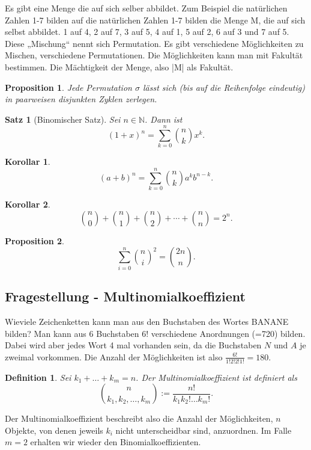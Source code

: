 \documentclass[12pt, twoside]{article}
\newcommand{\N}{\mathbb{N}}
\newtheorem{Sa}{Satz}[subsection]
\newtheorem{Kor}{Korollar}[subsection]
\newtheorem{Prop}{Proposition}[subsection]
\newtheorem{Def}{Definition}[subsection]
\begin{document}
Es gibt eine Menge die auf sich selber abbildet. Zum Beispiel die natürlichen Zahlen 1-7 bilden auf die natürlichen Zahlen 1-7 
bilden die Menge M, die auf sich selbst abbildet. 1 auf 4, 2  auf 7, 3 auf 5, 4 auf 1, 5 auf 2, 6 auf 3 und 7 auf 5. Diese „Mischung“ 
nennt sich Permutation.  Es gibt verschiedene Möglichkeiten zu Mischen, verschiedene Permutationen. Die Möglichkeiten kann man mit Fakultät bestimmen. 
Die Mächtigkeit der Menge, also |M| als Fakultät.

\begin{Prop} 
Jede Permutation $\sigma$ lässt sich (bis auf die Reihenfolge eindeutig) in paarweisen disjunkten Zyklen zerlegen.
\end{Prop}

\begin{Sa}[Binomischer Satz]
Sei $n \in \N$. Dann ist
$$
(1+x)^n= \sum_{k=0}^{n} \binom{n}{k}x^k.
$$
\end{Sa}

\begin{Kor}
$$
(a+b)^n= \sum_{k=0}^{n} \binom{n}{k}a^kb^{n-k}.
$$
\end{Kor}


\begin{Kor}
$$
\binom{n}{0}+\binom{n}{1}+\binom{n}{2}+\cdots+\binom{n}{n}=2^n.
$$
\end{Kor}

\begin{Prop}
$$
\sum_{i=0}^{n}\binom{n}{i}^2=\binom{2n}{n}.
$$
\end{Prop}

\subsection{Fragestellung - Multinomialkoeffizient}
Wieviele Zeichenketten kann man aus den Buchstaben des Wortes BANANE bilden? Man kann aus 
6 Buchstaben 6! verschiedene Anordnungen (=720) bilden. Dabei wird aber jedes  Wort 4 mal vorhanden sein,
 da die Buchstaben $N$ und $A$ je zweimal vorkommen. Die Anzahl der Möglichkeiten ist also 
 $\frac{6!}{1! 2! 2! 1!}=180$. \begin{Def} Sei $k_1+ \ldots + k_m = n$. Der Multinomialkoeffizient ist definiert als
$$
\binom{n}{k_1, k_2, \ldots, k_m}:=\frac{n!}{k_1 k_2! \ldots k_m!}.
$$

\end{Def}

Der Multinomialkoeffizient beschreibt also die Anzahl der Möglichkeiten, $n$ Objekte, von denen jeweils
$k_i$ nicht unterscheidbar sind, anzuordnen. Im Falle $m=2$ erhalten wir wieder den Binomialkoeffizienten.
\end{document}
